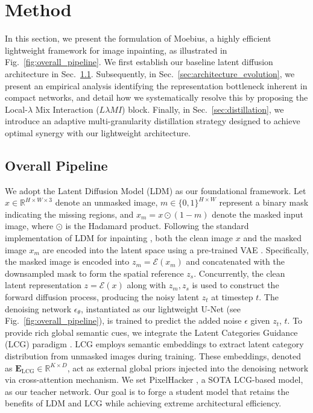 \documentclass[runningheads]{llncs}
\begin{document}
\vspace{-0.8em}
\section{Method}\label{sec:method}
\vspace{-0.5em}
In this section, we present the formulation of Moebius, a highly efficient light\-weight framework for image inpainting, as illustrated in Fig.~\ref{fig:overall_pipeline}. We first establish our baseline latent diffusion architecture in Sec.~\ref{sec:pipeline}. Subsequently, in Sec.~\ref{sec:architecture_evolution}, we present an empirical analysis identifying the representation bottleneck inherent in compact networks, and detail how we systematically resolve this by proposing the Local-$\lambda$ Mix Interaction ($L\lambda MI$) block. Finally, in Sec.~\ref{sec:distillation}, we introduce an adaptive multi-granularity distillation strategy designed to achieve optimal synergy with our lightweight architecture.

\vspace{-0.5em}
\subsection{Overall Pipeline}\label{sec:pipeline}
\vspace{-0.5em}
We adopt the Latent Diffusion Model (LDM) \cite{Rombach2022LDM} as our foundational framework. Let $x \in \mathbb{R}^{H \times W \times 3}$ denote an unmasked image, $m \in \{0,1\}^{H \times W}$ represent a binary mask indicating the missing regions, and $x_{m} = x \odot (1-m)$ denote the masked input image, where $\odot$ is the Hadamard product. Following the standard implementation of LDM for inpainting \cite{Rombach2022LDM,podell2023sdxl,esser2024SD3, ju2024brushnet}, both the clean image $x$ and the masked image $x_{m}$ are encoded into the latent space using a pre-trained VAE \cite{Rombach2022LDM}. Specifically, the masked image is encoded into $z_{m} = \mathcal{E}(x_{m})$ and concatenated with the downsampled mask to form the spatial reference $z_{s}$. Concurrently, the clean latent representation $z = \mathcal{E}(x)$ along with $z_{m}, z_{s}$ is used to construct the forward diffusion process, producing the noisy latent $z_t$ at timestep $t$. The denoising network $\epsilon_\theta$, instantiated as our lightweight U-Net (see Fig.~\ref{fig:overall_pipeline}), is trained to predict the added noise $\epsilon$ given $z_t$, $t$.
To provide rich global semantic cues, we integrate the Latent Categories Guidance (LCG) paradigm \cite{xu2025pixelhacker}. LCG employs semantic embeddings to extract latent category distribution from unmasked images during training. These embeddings, denoted as $\mathbf{E}_\text{LCG} \in \mathbb{R}^{K \times D}$, act as external global priors injected into the denoising network via cross-attention mechanism. We set PixelHacker \cite{xu2025pixelhacker}, a SOTA LCG-based model, as our teacher network. Our goal is to forge a student model that retains the benefits of LDM and LCG while achieving extreme architectural efficiency.
\end{document}

